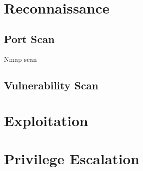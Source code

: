 \documentclass[10pt,reqno]{article}
\begin{document}
\begin{titlepage}
\end{titlepage}

\tableofcontents
\thispagestyle{empty}
\pagebreak
\setcounter{page}{1}

\section{Reconnaissance}

\subsection{Port Scan}

\label{nmap-cmd}
\begin{mybox}[listing options={language=bash,otherkeywords={nmap}}]{Nmap scan}
\end{mybox}

\subsection{Vulnerability Scan}

\section{Exploitation}

\section{Privilege Escalation}
\end{document}
